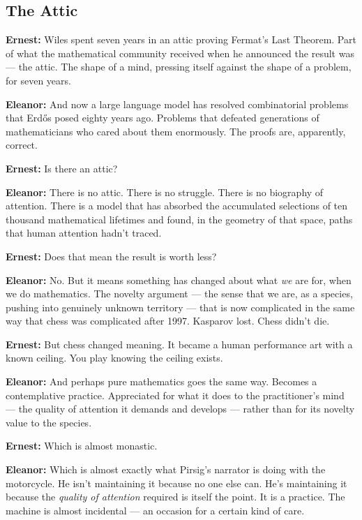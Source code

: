 \vspace{1.5em}
 
\subsection*{The Attic}
 
\noindent\textbf{Ernest:} Wiles spent seven years in an attic proving Fermat's Last Theorem. Part of what
the mathematical community received when he announced the result was --- the attic.
The shape of a mind, pressing itself against the shape of a problem, for seven years.
 
\noindent\textbf{Eleanor:} And now a large language model has resolved combinatorial problems that Erd\H{o}s
posed eighty years ago. Problems that defeated generations of mathematicians who
cared about them enormously. The proofs are, apparently, correct.
 
\noindent\textbf{Ernest:} Is there an attic?
 
\noindent\textbf{Eleanor:} There is no attic. There is no struggle. There is no biography of attention.
There is a model that has absorbed the accumulated selections of ten thousand
mathematical lifetimes and found, in the geometry of that space, paths that human
attention hadn't traced.
 
\noindent\textbf{Ernest:} Does that mean the result is worth less?
 
\noindent\textbf{Eleanor:} No. But it means something has changed about what \textit{we} are for, when we do
mathematics. The novelty argument --- the sense that we are, as a species, pushing
into genuinely unknown territory --- that is now complicated in the same way that
chess was complicated after 1997. Kasparov lost. Chess didn't die.
 
\noindent\textbf{Ernest:} But chess changed meaning. It became a human performance art with a known
ceiling. You play knowing the ceiling exists.
 
\noindent\textbf{Eleanor:} And perhaps pure mathematics goes the same way. Becomes a contemplative
practice. Appreciated for what it does to the practitioner's mind --- the quality
of attention it demands and develops --- rather than for its novelty value to the species.
 
\noindent\textbf{Ernest:} Which is almost monastic.
 
\noindent\textbf{Eleanor:} Which is almost exactly what Pirsig's narrator is doing with the motorcycle.
He isn't maintaining it because no one else can. He's maintaining it because
the \textit{quality of attention} required is itself the point. It is a practice.
The machine is almost incidental --- an occasion for a certain kind of care.
 
